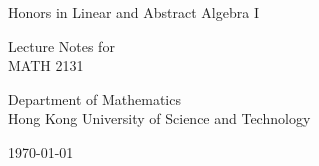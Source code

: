 \documentclass[
	11pt, %
	fleqn, %
	a4paper, %
]{LegrandOrangeBook}
\begin{document}

\titlepage %
	{ %
		\centering\sffamily %
		\vspace{3cm}
		{\huge\color{ocre} Honors in Linear and Abstract Algebra I\par} %
		\vspace{2cm} %
		{Lecture Notes for\\MATH 2131\par} %
        \vspace{2cm}
        {Department of Mathematics\\Hong Kong University of Science and Technology\par}
        \vspace{5cm}
        {\today \par}
		\vfill
	}


\thispagestyle{empty} %

~\vfill %

% 
% 


\pagestyle{empty} %
\end{document}
